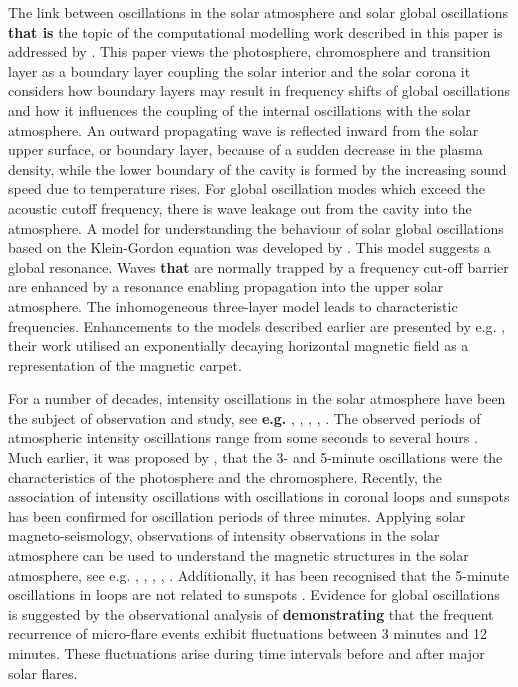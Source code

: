 \documentclass[physics,article,submit,pdftex,moreauthors]{Definitions/mdpi}
\begin{document}
The link between oscillations in the solar atmosphere and solar global oscillations {\bf that is} the topic of the computational modelling work described in this paper is addressed by \citet{Erdelyi2006}. This paper views the photosphere, chromosphere and transition layer as a boundary layer coupling the solar interior and the solar corona it considers how boundary layers may result in frequency shifts of global oscillations and how it influences the coupling of the internal oscillations with the solar atmosphere. 
An outward propagating wave is reflected inward from the solar upper surface, or boundary layer, because of a sudden decrease in the plasma density, while the lower boundary of the cavity is formed by the increasing sound speed due to temperature rises. For global oscillation modes which exceed the acoustic cutoff frequency, there is wave leakage out from the cavity into the atmosphere. A model for understanding the behaviour of solar global oscillations based on the Klein-Gordon equation was developed by \citet{Taroyan2008}. This model suggests a global resonance. Waves {\bf that} are normally trapped by a frequency cut-off barrier are enhanced by a resonance enabling propagation into the upper solar atmosphere. The inhomogeneous three-layer model leads to characteristic frequencies. Enhancements to the models described earlier are presented by e.g. \citet{Pinter2007},  their work utilised an exponentially decaying horizontal magnetic field as a representation of the magnetic carpet. 
 
 For a number of decades, intensity oscillations in the solar atmosphere have been the subject of observation and study, see {\bf e.g.} \citet{Banerjee2011}, \citet{deMoortel2009}, \citet{Mathioudakis2013}, \citet{Ruderman2009}, \citet{Wang2011}. The observed periods of atmospheric intensity oscillations range from some seconds to several hours \citet{Auchere2014}. Much earlier, it was proposed by \citet{Jensen1963}, that the 3- and 5-minute oscillations were the characteristics of the photosphere and the chromosphere. Recently, the association of intensity oscillations with oscillations in coronal loops and sunspots has been confirmed for oscillation periods of three minutes. Applying solar magneto-seismology, observations of intensity observations in the solar atmosphere can be used to understand the magnetic structures in the solar atmosphere, see e.g. \citet{Roberts1984}, \citet{Banerjee2007}, \citet{Zaqarashvili2007}, \citet{Erdelyi2008}, \citet{Verth2010}.  Additionally, it has been recognised that the 5-minute oscillations in loops are not related to sunspots \citet{deMoortel2002}. Evidence for global oscillations is suggested by the observational analysis of \citet{Gyenge2018} {\bf demonstrating} that the frequent recurrence of micro-flare events exhibit fluctuations between 3 minutes and 12 minutes. These fluctuations arise during time intervals before and after major solar flares.
\end{document}
